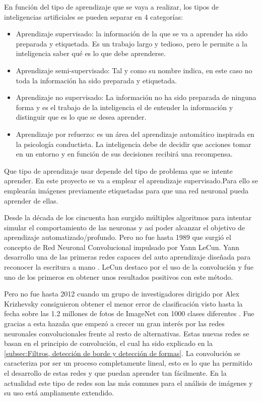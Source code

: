 En función del tipo de aprendizaje que se vaya a realizar, los tipos de inteligencias artificiales se pueden separar en 4 categorías:
\begin{itemize}
\item Aprendizaje supervisado: la información de la que se va a aprender ha sido preparada y etiquetada. Es un trabajo largo y tedioso, pero le permite a la inteligencia saber qué es lo que debe aprenderse.
\item Aprendizaje semi-supervisado: Tal y como su nombre indica, en este caso no toda la información ha sido preparada y etiquetada. 
\item Aprendizaje no supervisado: La información no ha sido preparada de ninguna forma y es el trabajo de la inteligencia el de entender la información y distinguir que es lo que se desea aprender.
\item Aprendizaje por refuerzo: es un área del aprendizaje automático inspirada en la psicología conductista. La inteligencia debe de decidir que acciones tomar en un entorno y en función de sus decisiones recibirá una recompensa.
\end{itemize}

Que tipo de aprendizaje usar depende del tipo de problema que se intente aprender. En este proyecto se va a emplear el aprendizaje supervisado.Para ello se emplearán imágenes previamente etiquetadas para que una red neuronal pueda aprender de ellas.

Desde la década de los cincuenta han surgido múltiples algoritmos para intentar simular el comportamiento de las neuronas y así poder alcanzar el objetivo de aprendizaje automatizado/profundo. Pero no fue hasta 1989 que surgió el concepto de Red Neuronal Convolucional impulsado por Yann LeCun. Yann desarrollo una de las primeras redes capaces del auto aprendizaje diseñada para reconocer la escritura a mano \cite{LeCun}. LeCun destaco por el uso de la convolución y fue uno de los primeros en obtener unos resultados positivos con este método.

Pero no fue hasta 2012 cuando un grupo de investigadores dirigido por Alex Krizhevsky consiguieron obtener el menor error de clasificación visto hasta la fecha sobre las 1.2 millones de fotos de ImageNet con 1000 clases diferentes \cite{AlexNet}. Fue gracias a esta hazaña que empezó a crecer un gran interés por las redes neuronales convolucionales frente al resto de alternativas. Estas nuevas redes se basan en el principio de convolución, el cual ha sido explicado en la \autoref{subsec:Filtros, detección de borde y detección de formas}. La convolución se caracteriza por ser un proceso completamente lineal, esto es lo que ha permitido el desarrollo de estas redes y que puedan aprender tan fácilmente. En la actualidad este tipo de redes son las más comunes para el análisis de imágenes y su uso está ampliamente extendido.

